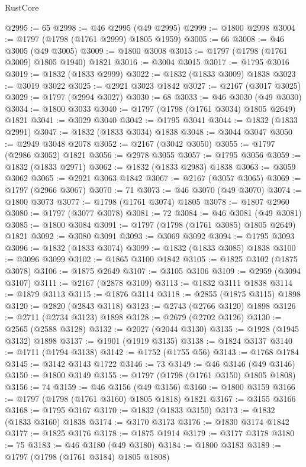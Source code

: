 \begin{lexlean}{RustCore}
\begin{coremodule}
@2995 := 65
@2998 := @46 @2995 (@49 @2995)
@2999 := @1800 @2998
@3004 := @1797 (@1798 (@1761 @2999) @1805 @1959)
@3005 := 66
@3008 := @46 @3005 (@49 @3005)
@3009 := @1800 @3008
@3015 := @1797 (@1798 (@1761 @3009) @1805 @1940) @1821
@3016 := @3004 @3015
@3017 := @1795 @3016
@3019 := @1832 (@1833 @2999)
@3022 := @1832 (@1833 @3009) @1838
@3023 := @3019 @3022
@3025 := @2921 @3023 @1842
@3027 := @2167 (@3017 @3025)
@3029 := @1797 (@2994 @3027)
@3030 := 68
@3033 := @46 @3030 (@49 @3030)
@3034 := @1800 @3033
@3040 := @1797 (@1798 (@1761 @3034) @1805 @2649) @1821
@3041 := @3029 @3040
@3042 := @1795 @3041
@3044 := @1832 (@1833 @2991)
@3047 := @1832 (@1833 @3034) @1838
@3048 := @3044 @3047
@3050 := @2949 @3048 @2078
@3052 := @2167 (@3042 @3050)
@3055 := @1797 (@2986 @3052) @1821
@3056 := @2978 @3055
@3057 := @1795 @3056
@3059 := @1832 (@1833 @2971)
@3062 := @1832 (@1833 @2983) @1838
@3063 := @3059 @3062
@3065 := @2921 @3063 @1842
@3067 := @2167 (@3057 @3065)
@3069 := @1797 (@2966 @3067)
@3070 := 71
@3073 := @46 @3070 (@49 @3070)
@3074 := @1800 @3073
@3077 := @1798 (@1761 @3074) @1805
@3078 := @1807 @2960
@3080 := @1797 (@3077 @3078)
@3081 := 72
@3084 := @46 @3081 (@49 @3081)
@3085 := @1800 @3084
@3091 := @1797 (@1798 (@1761 @3085) @1805 @2649) @1821
@3092 := @3080 @3091
@3093 := @3069 @3092
@3094 := @1795 @3093
@3096 := @1832 (@1833 @3074)
@3099 := @1832 (@1833 @3085) @1838
@3100 := @3096 @3099
@3102 := @1865 @3100 @1842
@3105 := @1825 @3102 (@1875 @3078)
@3106 := @1875 @2649
@3107 := @3105 @3106
@3109 := @2959 (@3094 @3107)
@3111 := @2167 (@2878 @3109)
@3113 := @1832 @3111 @1838
@3114 := @1879 @3113
@3115 := @1876 @3114
@3118 := @2855 (@1875 @3115) @1898
@3120 := @2820 (@2843 @3118)
@3123 := @2743 (@2766 @3120) @1898
@3126 := @2711 (@2734 @3123) @1898
@3128 := @2679 (@2702 @3126)
@3130 := @2565 (@2588 @3128)
@3132 := @2027 (@2044 @3130)
@3135 := @1928 (@1945 @3132) @1898
@3137 := @1901 (@1919 @3135)
@3138 := @1824 @3137
@3140 := @1711 (@1794 @3138)
@3142 := @1752 (@1755 @56)
@3143 := @1768 @1784
@3145 := @3142 @3143 @1722
@3146 := 73
@3149 := @46 @3146 (@49 @3146)
@3150 := @1800 @3149
@3155 := @1797 (@1798 (@1761 @3150) @1805 @1808)
@3156 := 74
@3159 := @46 @3156 (@49 @3156)
@3160 := @1800 @3159
@3166 := @1797 (@1798 (@1761 @3160) @1805 @1818) @1821
@3167 := @3155 @3166
@3168 := @1795 @3167
@3170 := @1832 (@1833 @3150)
@3173 := @1832 (@1833 @3160) @1838
@3174 := @3170 @3173
@3176 := @1830 @3174 @1842
@3177 := @1825 @3176
@3178 := @1875 @1914
@3179 := @3177 @3178
@3180 := 75
@3183 := @46 @3180 (@49 @3180)
@3184 := @1800 @3183
@3189 := @1797 (@1798 (@1761 @3184) @1805 @1808)

\end{coremodule}
\end{lexlean}
